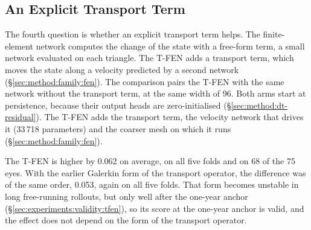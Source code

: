 \subsection{An Explicit Transport Term}
\label{sec:experiments:ingredients:transport}

The fourth question is whether an explicit transport term helps. The
finite-element network computes the change of the state with a free-form
term, a small network evaluated on each triangle. The T-FEN adds a
transport term, which moves the state along a velocity predicted by a
second network (\S\ref{sec:method:family:fen}). The comparison pairs the
T-FEN with the same network without the transport term, at the same width
of 96. Both arms start at persistence, because their output heads are
zero-initialised (\S\ref{sec:method:dt-residual}). The T-FEN adds the
transport term, the velocity network that drives it (33\,718 parameters)
and the coarser mesh on which it runs (\S\ref{sec:method:family:fen}).

The T-FEN is higher by 0.062 on average, on all five folds and on 68 of the
75 eyes. With the earlier Galerkin form of the transport operator, the
difference was of the same order, 0.053, again on all five folds. That form
becomes unstable in long free-running rollouts, but only well after the
one-year anchor (\S\ref{sec:experiments:validity:tfen}), so its score at
the one-year anchor is valid, and the effect does not depend on the form of the
transport operator.

